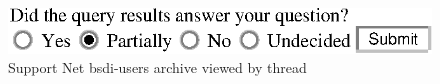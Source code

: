 \documentclass{article}
\begin{document}
\begin{figure}[htbp]
  \centering
  \includegraphics{test.eps}
  \caption{Support Net bsdi-users archive viewed by thread}
  \label{fig:supportnet-thread}
\end{figure}
\end{document}
